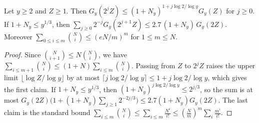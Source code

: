\begin{lemma}\label{lem:Gy}
Let $y\ge2$ and $Z\ge1$. Then $G_y(2^jZ)\le(1+N_y)^{1+j\log2/\log y}G_y(Z)$ for $j\ge0$. If $1+N_y\le y^{1/3}$, then
$\sum_{j\ge0}2^{-j}G_y(2^{j+1}Z)\le2.7\,(1+N_y)\,G_y(2Z)$. Moreover $\sum_{0\le i\le m}\binom Ni\le(eN/m)^m$ for
$1\le m\le N$.
\end{lemma}

\begin{proof}
Since $\binom N{i+1}\le N\binom Ni$, we have $\sum_{i\le m+1}\binom Ni\le(1+N)\sum_{i\le m}\binom Ni$. Passing from
$Z$ to $2^jZ$ raises the upper limit $\lfloor\log Z/\log y\rfloor$ by at most $\lceil j\log2/\log y\rceil\le1+j\log
2/\log y$, which gives the first claim. If $1+N_y\le y^{1/3}$, then $(1+N_y)^{j\log2/\log y}\le2^{j/3}$, so the sum is
at most $G_y(2Z)\bigl(1+(1+N_y)\sum_{j\ge1}2^{-2j/3}\bigr)\le2.7(1+N_y)G_y(2Z)$. The last claim is the standard bound
$\sum_{i\le m}\binom Ni\le\sum_{i\le m}\frac{N^i}{i!}\le(\frac Nm)^m\sum_i\frac{m^i}{i!}$.
\end{proof}

